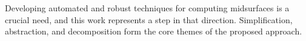 Developing automated and robust techniques for computing midsurfaces is a crucial need, and this work represents a step in that direction. Simplification, abstraction, and decomposition form the core themes of the proposed approach.
